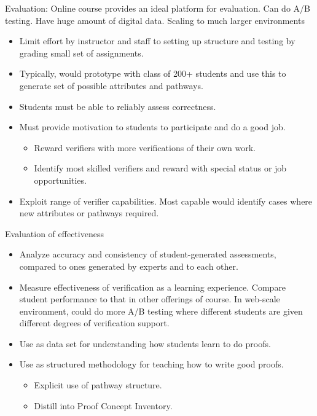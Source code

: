 \documentclass[12pt]{article}
\begin{document}
Evaluation: Online course provides an ideal platform for evaluation.
Can do A/B testing.  Have huge amount of digital data.
Scaling to much larger environments

\begin{itemize}
\item Limit effort by instructor and staff to setting up structure and
  testing by grading small set of assignments.
\item Typically, would prototype with class of 200+ students and
  use this to generate set of possible attributes and pathways.
\item Students must be able to reliably assess correctness.
\item Must provide motivation to students to participate and do a good job.
\begin{itemize}
\item Reward verifiers with more verifications of their own work.
\item Identify most skilled verifiers and reward with special status
  or job opportunities.
\end{itemize}
\item Exploit range of verifier capabilities.  Most capable would
  identify cases where new attributes or pathways required.
\end{itemize}

Evaluation of effectiveness

\begin{itemize}
\item Analyze accuracy and consistency of student-generated
  assessments, compared to ones generated by experts and to each other.
\item Measure effectiveness of verification as a learning experience.
  Compare student performance to that in other offerings of course.
  In web-scale environment, could do more A/B testing where different
  students are given different degrees of verification support.
\item Use as data set for understanding how students learn to do proofs.
\item Use as structured methodology for teaching how to write good proofs.
\begin{itemize}
\item Explicit use of pathway structure.
\item Distill into Proof Concept Inventory.
\end{itemize}

\end{itemize}
\end{document}
